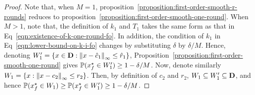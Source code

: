 \begin{proof}
Note that, when $M = 1$, proposition~\ref{proposition:first-order-smooth-r-rounds} reduces 
to proposition~\ref{proposition:first-order-smooth-one-round}. When $M > 1$, note that, 
the definition of $k_1$ and $T_1$ takes the same form as that in Eq~\eqref{eqn:existence-of-k-one-round-fo}. 
In addition, the condition of $k_1$ in Eq~\eqref{eqn:lower-bound-on-k-i-fo} changes by 
substituting $\delta$ by $\delta/M$.
Hence, denoting $W_1^\prime = \{x\in \mathbf{D}: \left\|{x-\hat{c}_1}\right\|_\infty \leq \hat{r}_1\}$, 
Proposition~\ref{proposition:first-order-smooth-one-round} gives 
$\mathbb{P}(x_f^\star \in W_1^\prime) \geq 1-\delta/M$. Now, denote similarly 
$W_1 = \{x: \left\|{x-c_2}\right\|_\infty \leq r_2\}$. Then, by definition of $c_2$ and $r_2$, 
$W_1 \subseteq W_1^\prime \subseteq \mathbf{D}$, 
and hence $\mathbb{P}(x_f^\star \in W_1) \geq \mathbb{P}(x_f^\star \in W_1^\prime) \geq 1-\delta/M$. 


\end{proof}
